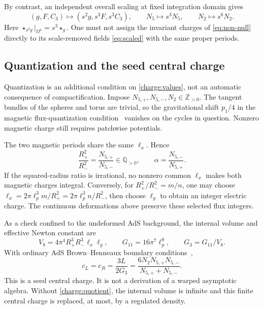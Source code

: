 By contrast, an independent overall scaling at fixed integration domain gives
\begin{equation}
(g,F,C_3)\mapsto(s^2g,s^3F,s^3C_3),\qquad
N_5\mapsto s^3N_5,\qquad N_2\mapsto s^6N_2.
\label{charge:scaling}
\end{equation}
Here $\star_{s^2g}|_{\Omega^4}=s^3\star_g$. One must not assign the invariant charges of \eqref{eq:non-null} directly to its scale-removed fields \eqref{eq:scaled} with the same proper periods.

\subsection{Quantization and the seed central charge}
Quantization is an additional condition on \eqref{charge:values}, not an automatic consequence of compactification. Impose $N_{5,+},N_{5,-},N_2\in\mathbb Z_{>0}$. The tangent bundles of the spheres and torus are trivial, so the gravitational shift $p_1/4$ in the magnetic flux-quantization condition~\cite{Witten1996flux} vanishes on the cycles in question. Nonzero magnetic charge still requires patchwise potentials.

The two magnetic periods share the same $\ell_x$. Hence
\begin{equation}
\frac{R_+^2}{R_-^2}=\frac{N_{5,+}}{N_{5,-}}\in\mathbb Q_{>0},\qquad
\alpha=\frac{N_{5,-}}{N_{5,+}}.
\label{charge:rationality}
\end{equation}
If the squared-radius ratio is irrational, no nonzero common $\ell_x$ makes both magnetic charges integral. Conversely, for $R_+^2/R_-^2=m/n$, one may choose $\ell_x=2\pi\ell_p^3m/R_+^2=2\pi\ell_p^3n/R_-^2$, then choose $\ell_y$ to obtain an integer electric charge. The continuous deformations above preserve these selected flux integers.

As a check confined to the undeformed AdS background, the internal volume and effective Newton constant are
\begin{equation}
V_8=4\pi^4R_+^3R_-^3\ell_x\ell_y,\qquad
G_{11}=16\pi^7\ell_p^9,\qquad G_3=G_{11}/V_8.
\end{equation}
With ordinary AdS Brown--Henneaux boundary conditions~\cite{BrownHenneaux1986},
\begin{equation}
c_L=c_R=\frac{3L}{2G_3}
=\frac{6N_2N_{5,+}N_{5,-}}{N_{5,+}+N_{5,-}}.
\label{charge:seed-central}
\end{equation}
This is a seed central charge. It is not a derivation of a warped asymptotic algebra. Without \eqref{charge:quotient}, the internal volume is infinite and this finite central charge is replaced, at most, by a regulated density.


